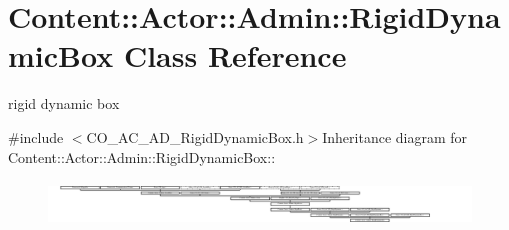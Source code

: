 \hypertarget{classContent_1_1Actor_1_1Admin_1_1RigidDynamicBox}{
\section{Content::Actor::Admin::RigidDynamicBox Class Reference}
\label{classContent_1_1Actor_1_1Admin_1_1RigidDynamicBox}
}


rigid dynamic box  


{\ttfamily \#include $<$CO\_\-AC\_\-AD\_\-RigidDynamicBox.h$>$}Inheritance diagram for Content::Actor::Admin::RigidDynamicBox::\begin{figure}[H]
\begin{center}
\leavevmode
\includegraphics[height=1.20245cm]{classContent_1_1Actor_1_1Admin_1_1RigidDynamicBox}
\end{center}
\end{figure}
